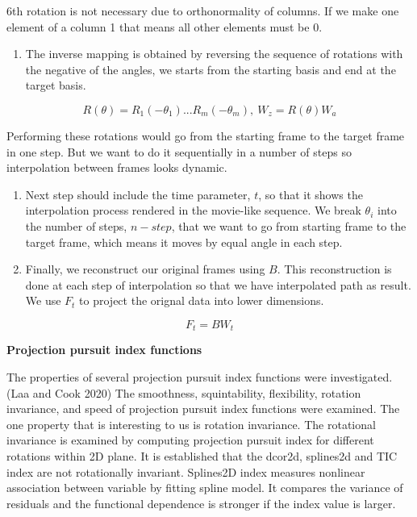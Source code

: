 6th rotation is not necessary due to orthonormality of columns. If we make one element of a column 1 that means all other elements must be 0.

\begin{enumerate}
\def\labelenumi{\arabic{enumi}.}
\setcounter{enumi}{3}
\tightlist
\item
  The inverse mapping is obtained by reversing the sequence of rotations with the negative of the angles, we starts from the starting basis and end at the target basis.
\end{enumerate}

\[R(\theta) = R_1(-\theta_1) ... R_m(-\theta_m), \    W_z = R(\theta)W_a\]

Performing these rotations would go from the starting frame to the target frame in one step. But we want to do it sequentially in a number of steps so interpolation between frames looks dynamic.

\begin{enumerate}
\def\labelenumi{\arabic{enumi}.}
\setcounter{enumi}{4}
\item
  Next step should include the time parameter, \(t\), so that it shows the interpolation process rendered in the movie-like sequence. We break \(\theta_i\) into the number of steps, \(n-step\), that we want to go from starting frame to the target frame, which means it moves by equal angle in each step.
\item
  Finally, we reconstruct our original frames using \(B\). This reconstruction is done at each step of interpolation so that we have interpolated path as result. We use \(F_t\) to project the orignal data into lower dimensions.
\end{enumerate}

\[F_t = B  W_t\]

\textbf{Projection pursuit index functions}

The properties of several projection pursuit index functions were investigated.(Laa and Cook 2020) The smoothness, squintability, flexibility, rotation invariance, and speed of projection pursuit index functions were examined. The one property that is interesting to us is rotation invariance. The rotational invariance is examined by computing projection pursuit index for different rotations within 2D plane. It is established that the dcor2d, splines2d and TIC index are not rotationally invariant. Splines2D index measures nonlinear association between variable by fitting spline model. It compares the variance of residuals and the functional dependence is stronger if the index value is larger.

